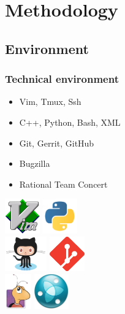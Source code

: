 %
%
\section{Methodology}

\currentSectionToc

\subsection{Environment}
\begin{frame}
    \frametitle{Technical environment}
    \begin{minipage}{0.49\textwidth}
    \begin{itemize}
        \item Vim, Tmux, Ssh
        \item C++, Python, Bash, XML
        \item Git, Gerrit, GitHub
        \item Bugzilla
        \item Rational Team Concert
    \end{itemize}
    \end{minipage}
    \begin{minipage}{0.49\textwidth}
        \flushright
        \includegraphics[height=1.5cm]{./img/vimLogo.png} \hspace{0.2cm}
        \includegraphics[height=1.5cm]{./img/pythonLogo.png} \\[0.3cm]
        \includegraphics[height=1.5cm]{./img/githubLogo.png} \hspace{0.2cm}
        \includegraphics[height=1.5cm]{./img/git-icon.pdf} \\[0.3cm]
        \includegraphics[height=1.5cm]{./img/bzLogo.png} \hspace{0.2cm}
        \includegraphics[height=1.5cm]{./img/rtcLogo.jpg}
    \end{minipage}
\end{frame}

